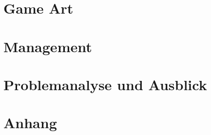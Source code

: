 \clearpage
\section{Game Art}




\clearpage
\section{Management}

%
%

\clearpage
\section{Problemanalyse und Ausblick}


\clearpage
\section{Anhang}







\clearpage
\nocite{*}

%
